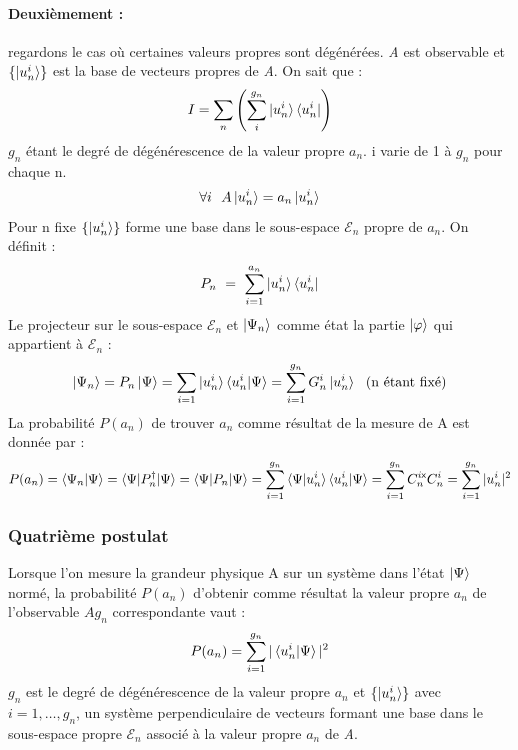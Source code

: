 \documentclass[12pt,a4paper,titlepage]{book}
\begin{document}
\paragraph*{Deuxièmement :}

regardons le cas où certaines valeurs propres sont dégénérées. \textit{A} est observable et $\lbrace \ket{u_n^i} \rbrace$ est la base de vecteurs propres de \textit{A}. On sait que :
\begin{equation*}
I = \sum\limits_n \left( \sum_i^{g_n} \ket{u_n^i} \bra{u_n^i} \right)
\end{equation*}
$g_n$ étant le degré de dégénérescence de la valeur propre $a_n$. i varie de 1 à $g_n$ pour chaque n.
\begin{equation*}
\forall i ~~ A \ket{u_n^i} = a_n \ket{u_n^i}
\end{equation*}
Pour n fixe $\lbrace \ket{u_n^i} \rbrace$ forme une base dans le sous-espace $\mathcal{E}_n$ propre de $a_n$. On définit :
\begin{equation*}
P_n ~=~ \sum\limits_{i=1}^{a_n} \ket{u_n^i} \bra{u_n^i}
\end{equation*}
Le projecteur sur le sous-espace $\mathcal{E}_n$ et $\ket{\Psi_n}$ comme état la partie $\ket\varphi$ qui appartient à $\mathcal{E}_n$ :
\begin{equation*}
\ket{\Psi_n} = P_n \ket\Psi = \sum\limits_{i=1} \ket{u_n^i} \braket{u_n^i | \Psi} = \sum\limits_{i=1}^{g_n} G_n^i \ket{u_n^i} ~~\text{(n étant fixé)}
\end{equation*}
La probabilité $P(a_n)$ de trouver $a_n$ comme résultat de la mesure de A est donnée par :
\begin{equation*}
P(a_n) = \braket{\Psi_n | \Psi} = \braket{\Psi | P_n^\dagger | \Psi} = \braket{\Psi | P_n | \Psi} = \sum\limits_{i=1}^{g_n} \braket{\Psi | u_n^i} \braket{u_n^i | \Psi} = \sum\limits_{i=1}^{g_n} C_n^{i\mathsf{x}} C_n^i = \sum\limits_{i=1}^{g_n} \vert u_n^i \vert^2
\end{equation*}

\subsubsection{Quatrième postulat}
Lorsque l'on mesure la grandeur physique A sur un système dans l'état $\ket\Psi$ normé, la probabilité $P(a_n)$ d'obtenir comme résultat la valeur propre $a_n$ de l'observable $A g_n$ correspondante vaut :
\begin{equation*}
P(a_n) = \sum\limits_{i=1}^{g_n} \vert \braket{u_n^i | \Psi} \vert^2
\end{equation*}
$g_n$ est le degré de dégénérescence de la valeur propre $a_n$ et $\lbrace \ket{u_n^i} \rbrace$ avec $i = 1, \ldots, g_n$, un système perpendiculaire de vecteurs formant une base dans le sous-espace propre $\mathcal{E}_n$ associé à la valeur propre $a_n$ de \textit{A}.
\end{document}
